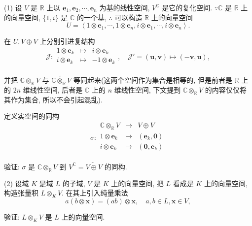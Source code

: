 \documentclass[color=black,device=normal,lang=cn,mode=geye]{elegantnote}
\begin{document}
\begin{exercise}%
    (1) 设 $V$ 是 $\mathbb{R}$ 上以 $\boldsymbol{e}_1,\boldsymbol{e}_2,\cdots,\boldsymbol{e}_n$ 为基的线性空间, $V^\mathbb{C}$ 是它的复化空间. $\because\mathbb{C}$ 是 $\mathbb{R}$ 上的向量空间, $\{1,i\}$ 是 $\mathbb{C}$ 的一个基, $\therefore$ 可以构造 $\mathbb{R}$ 上的向量空间
    \[U=\left<1\otimes\boldsymbol{e}_1,\cdots,1\otimes\boldsymbol{e}_n,i\otimes\boldsymbol{e}_1,\cdots,i\otimes\boldsymbol{e}_n\right>.\]

    在 $U,V\oplus V$ 上分别引进复结构
    \[\mathcal{J}:\begin{array}{rcl}
        1\otimes\boldsymbol{e}_k & \mapsto & i\otimes\boldsymbol{e}_k \\
        i\otimes\boldsymbol{e}_k & \mapsto & -1\otimes\boldsymbol{e}_k \\
    \end{array},\quad\mathcal{J}'=(\boldsymbol{u},\boldsymbol{v})\mapsto(-\boldsymbol{v},\boldsymbol{u}),\]

    并把 $\mathbb{C}\otimes_\mathbb{R}V$ 与 $\widetilde{\mathbb{C}\otimes_\mathbb{R}V}$ 等同起来(这两个空间作为集合是相等的, 但是前者是 $\mathbb{R}$ 上的 $2n$ 维线性空间, 后者是 $\mathbb{C}$ 上的 $n$ 维线性空间, 下文提到 $\mathbb{C}\otimes_\mathbb{R}V$ 的内容仅仅将其作为集合, 所以不会引起混乱).

    定义实空间的同构
    \[\sigma:\begin{array}{rcl}
        \mathbb{C}\otimes_\mathbb{R}V & \to & V\oplus V \\
        1\otimes\boldsymbol{e}_k & \mapsto & (\boldsymbol{e}_k,\boldsymbol{0}) \\
        i\otimes\boldsymbol{e}_k & \mapsto & (\boldsymbol{0},\boldsymbol{e}_k) \\
    \end{array}\]
    
    验证: $\sigma$ 是 $\mathbb{C}\otimes_\mathbb{R}V$ 到 $V^\mathbb{C}=\widetilde{V\oplus V}$ 的同构.

    (2) 设域 $K$ 是域 $L$ 的子域, $V$ 是 $K$ 上的向量空间, 把 $L$ 看成是 $K$ 上的向量空间, 构造张量积 $L\otimes_KV$. 在其上引入纯量乘法
    \[a(b\otimes\boldsymbol{x})=(ab)\otimes\boldsymbol{x},\quad a,b\in L,\boldsymbol{x}\in V,\]

    验证: $L\otimes_KV$ 是 $L$ 上的向量空间.
\end{exercise}
\end{document}
